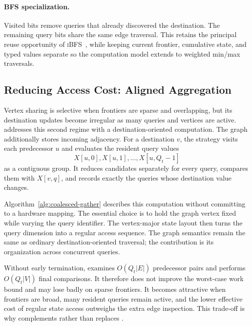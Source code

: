 \paragraph{BFS specialization.}
Visited bits remove queries that already discovered the destination.  The remaining query bits share the same edge traversal.  This retains the principal reuse opportunity of \textsc{iBFS}~\cite{liu_ibfs_2016}, while keeping current frontier, cumulative state, and typed values separate so the computation model extends to weighted min/max traversals.

\subsection{Reducing Access Cost: Aligned Aggregation}
\label{sec:gather}

Vertex sharing is selective when frontiers are sparse and overlapping, but its destination updates become irregular as many queries and vertices are active.  \coalescedgather addresses this second regime with a destination-oriented computation.  The graph additionally stores incoming adjacency.  For a destination $v$, the strategy visits each predecessor $u$ and evaluates the resident query values
\begin{equation}
  X[u,0],X[u,1],\ldots,X[u,Q_t-1]
\end{equation}
as a contiguous group.  It reduces candidates separately for every query, compares them with $X[v,q]$, and records exactly the queries whose destination value changes.

Algorithm~\ref{alg:coalesced-gather} describes this computation without committing to a hardware mapping.  The essential choice is to hold the graph vertex fixed while varying the query identifier.  The vertex-major state layout then turns the query dimension into a regular access sequence.  The graph semantics remain the same as ordinary destination-oriented traversal; the contribution is its organization across concurrent queries.



Without early termination, \coalescedgather examines $O(Q_t|E|)$ predecessor pairs and performs $O(Q_t|V|)$ final comparisons.  It therefore does not improve the worst-case work bound and may lose badly on sparse frontiers.  It becomes attractive when frontiers are broad, many resident queries remain active, and the lower effective cost of regular state access outweighs the extra edge inspection.  This trade-off is why \coalescedgather complements rather than replaces \sharedexpand.

